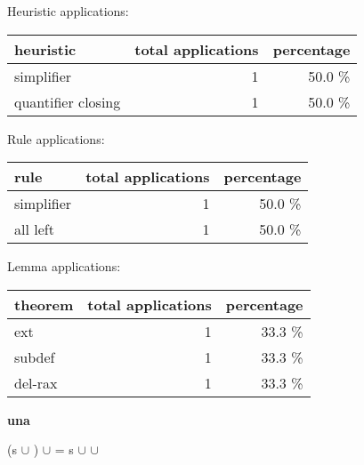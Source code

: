 \documentclass[a4paper]{article}
\begin{document}
\medskip


Heuristic applications:

\begin{supertabular}{l|r|r}
heuristic	& total applications & percentage \\ \hline
simplifier & 1 & 50.0 \% \\
quantifier closing & 1 & 50.0 \% \\

\end{supertabular}

Rule applications:

\begin{supertabular}{l|r|r}
rule	        & total applications & percentage \\ \hline
simplifier & 1 & 50.0 \% \\
all left & 1 & 50.0 \% \\

\end{supertabular}

Lemma applications:

\begin{supertabular}{l|r|r}
theorem	        & total applications & percentage \\ \hline
ext & 1 & 33.3 \% \\
subdef & 1 & 33.3 \% \\
del-rax & 1 & 33.3 \% \\

\end{supertabular}
\pagebreak

{\LARGE\bf una}\label{lemma-una}

\medskip

 \Fol (s $\cup$ ) $\cup$  = s $\cup$  $\cup$ 
\end{document}
